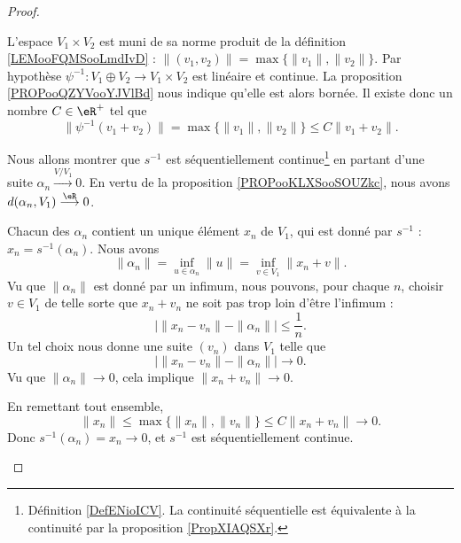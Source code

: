 \begin{proof}
\begin{subproof}
\begin{subproof}
            L'espace \( V_1\times V_2\) est muni de sa norme produit de la définition \ref{LEMooFQMSooLmdIvD} : \( \| (v_1,v_2) \|=\max\{ \| v_1 \|, \| v_2 \| \}\). Par hypothèse \( \psi^{-1}\colon V_1\oplus V_2\to V_1\times V_2\) est linéaire et continue. La proposition \ref{PROPooQZYVooYJVlBd} nous indique qu'elle est alors bornée. Il existe donc un nombre \( C\in \eR^+\) tel que
            \begin{equation}
                \| \psi^{-1}(v_1+v_2) \|=\max\{ \| v_1 \|,\| v_2 \| \}\leq C\| v_1+v_2 \|.
            \end{equation}
            
            Nous allons montrer que \( s^{-1}\) est séquentiellement continue\footnote{Définition \ref{DefENioICV}. La continuité séquentielle est équivalente à la continuité par la proposition \ref{PropXIAQSXr}.} en partant d'une suite \( \alpha_n\stackrel{V/V_1}{\longrightarrow}0\). En vertu de la proposition \ref{PROPooKLXSooSOUZkc}, nous avons \( d(\alpha_n,V_1)\stackrel{\eR}{\longrightarrow}0\).

            Chacun des \( \alpha_n\) contient un unique élément \( x_n\) de \( V_1\), qui est donné par \( s^{-1}\) : \( x_n= s^{-1}(\alpha_n)\). Nous avons
            \begin{equation}
                \| \alpha_n \|=\inf_{u\in \alpha_n}\| u \|=\inf_{v\in V_1}\| x_n+v \|.
            \end{equation}
            Vu que \( \| \alpha_n \|\) est donné par un infimum, nous pouvons, pour chaque \( n\), choisir \( v\in V_1\) de telle sorte que \( x_n+v_n\) ne soit pas trop loin d'être l'infimum :
            \begin{equation}
                \big| \| x_n-v_n \|-\| \alpha_n \| \big|\leq \frac{1}{ n }.
            \end{equation}
            Un tel choix nous donne une suite \( (v_n)\) dans \( V_1\) telle que
            \begin{equation}
                \big| \| x_n-v_n \|-\| \alpha_n \| \big|\to 0.
            \end{equation}
            Vu que \( \| \alpha_n \|\to 0\), cela implique \( \| x_n+v_n \|\to 0\).

            En remettant tout ensemble,
            \begin{equation}
                \| x_n \|\leq \max\{ \| x_n \|,\| v_n \| \}\leq C\| x_n+v_n \|\to 0.
            \end{equation}
            Donc \( s^{-1}(\alpha_n)=x_n\to 0\), et \( s^{-1}\) est séquentiellement continue.
        \end{subproof}


\end{subproof}
\end{proof}
